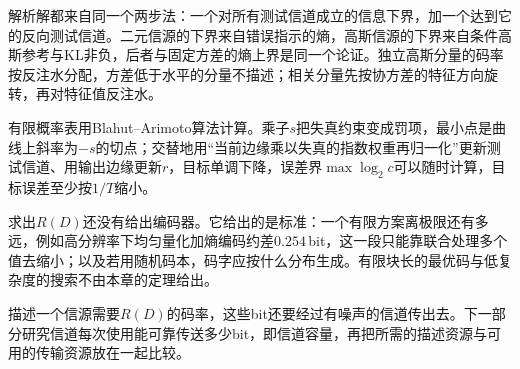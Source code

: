 解析解都来自同一个两步法：一个对所有测试信道成立的信息下界，加一个达到它的反向测试信道。二元信源的下界来自错误指示的熵，高斯信源的下界来自条件高斯参考与KL非负，后者与固定方差的熵上界是同一个论证。独立高斯分量的码率按反注水分配，方差低于水平的分量不描述；相关分量先按协方差的特征方向旋转，再对特征值反注水。

有限概率表用Blahut–Arimoto算法计算。乘子$s$把失真约束变成罚项，最小点是曲线上斜率为$-s$的切点；交替地用“当前边缘乘以失真的指数权重再归一化”更新测试信道、用输出边缘更新$r$，目标单调下降，误差界$\max\log_2c$可以随时计算，目标误差至少按$1/T$缩小。

求出$R(D)$还没有给出编码器。它给出的是标准：一个有限方案离极限还有多远，例如高分辨率下均匀量化加熵编码约差$0.254$\,bit，这一段只能靠联合处理多个值去缩小；以及若用随机码本，码字应按什么分布生成。有限块长的最优码与低复杂度的搜索不由本章的定理给出。

描述一个信源需要$R(D)$的码率，这些bit还要经过有噪声的信道传出去。下一部分研究信道每次使用能可靠传送多少bit，即信道容量，再把所需的描述资源与可用的传输资源放在一起比较。

